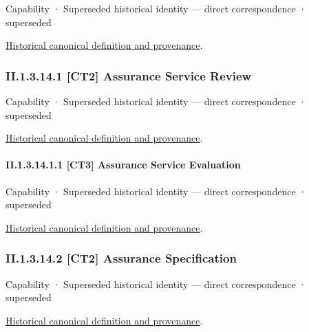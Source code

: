 \label{element:88bf57b7a92c4c1da1b5f0a67d3ebd82}
{\small Capability · Superseded historical identity — direct correspondence · superseded}\par
\href{../../../../continuum/strategy/capability/88bf57b7a92c4c1da1b5f0a67d3ebd82.md}{Historical canonical definition and provenance}.\par
\subsubsection*{II.1.3.14.1 [CT2] Assurance Service Review}
\label{navigation:II.1.3.14.1}

\label{element:b345cb12b45746409302899514126170}
{\small Capability · Superseded historical identity — direct correspondence · superseded}\par
\href{../../../../continuum/strategy/capability/b345cb12b45746409302899514126170.md}{Historical canonical definition and provenance}.\par
\paragraph*{II.1.3.14.1.1 [CT3] Assurance Service Evaluation}
\label{navigation:II.1.3.14.1.1}

\label{element:be34b54314c6444f8418d645f6c83b6d}
{\small Capability · Superseded historical identity — direct correspondence · superseded}\par
\href{../../../../continuum/strategy/capability/be34b54314c6444f8418d645f6c83b6d.md}{Historical canonical definition and provenance}.\par
\subsubsection*{II.1.3.14.2 [CT2] Assurance Specification}
\label{navigation:II.1.3.14.2}

\label{element:8006ee0dd95f4d7fb1f408fa09b6ce19}
{\small Capability · Superseded historical identity — direct correspondence · superseded}\par
\href{../../../../continuum/strategy/capability/8006ee0dd95f4d7fb1f408fa09b6ce19.md}{Historical canonical definition and provenance}.\par
